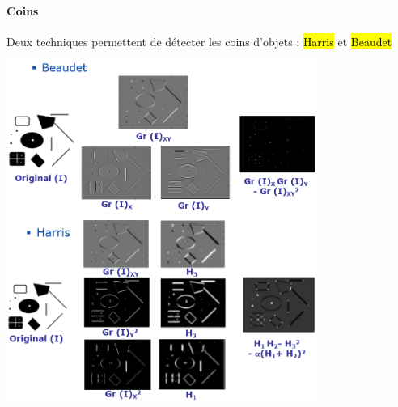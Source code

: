 \documentclass[letterpaper, 12pt]{article}
\newcommand{\alinea}{
\hspace*{0.5cm}}
\begin{document}
			\paragraph{Coins}
				\alinea Deux techniques permettent de détecter les coins d'objets : \hl{Harris} et \hl{Beaudet}
				\begin{center}
				 	\includegraphics[width=4in]{Images/beaudet}
				 	\includegraphics[width=4in]{Images/harris}
				 \end{center} 
\end{document}
